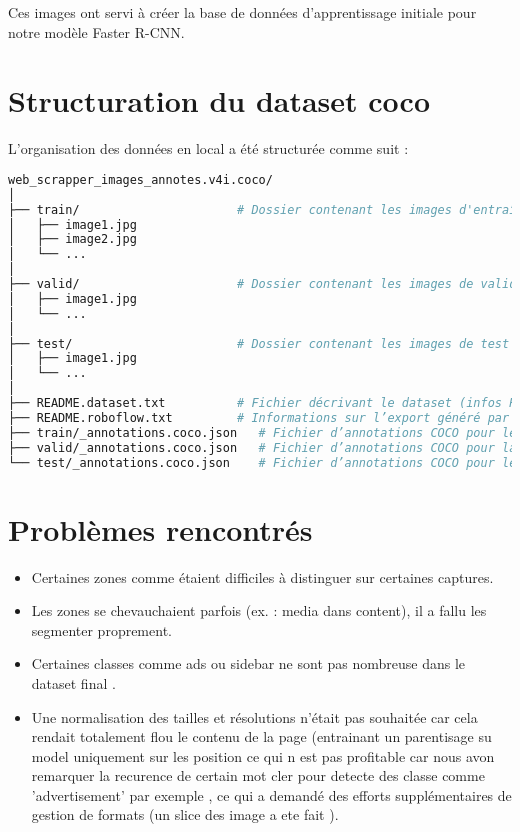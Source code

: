 \documentclass[12pt,a4paper]{report}
\begin{document}
Ces images ont servi à créer la base de données d'apprentissage initiale pour notre modèle Faster R-CNN.

\section{Structuration du dataset coco }

L'organisation des données en local a été structurée comme suit :

\begin{lstlisting}[language=bash,caption={Structure du dataset exporté depuis Roboflow (format COCO)},label={lst:roboflow-structure}]
web_scrapper_images_annotes.v4i.coco/
│
├── train/                      # Dossier contenant les images d'entraînement
│   ├── image1.jpg
│   ├── image2.jpg
│   └── ...
│
├── valid/                      # Dossier contenant les images de validation
│   ├── image1.jpg
│   └── ...
│
├── test/                       # Dossier contenant les images de test
│   ├── image1.jpg
│   └── ...
│
├── README.dataset.txt          # Fichier décrivant le dataset (infos Roboflow, classes, etc.)
├── README.roboflow.txt         # Informations sur l’export généré par Roboflow
├── train/_annotations.coco.json   # Fichier d’annotations COCO pour les images d'entraînement
├── valid/_annotations.coco.json   # Fichier d’annotations COCO pour la validation
└── test/_annotations.coco.json    # Fichier d’annotations COCO pour le test
\end{lstlisting}


\section{Problèmes rencontrés}
\begin{itemize}
\item Certaines zones comme  étaient difficiles à distinguer sur certaines captures.
\item Les zones se chevauchaient parfois (ex. : media dans content), il a fallu les segmenter proprement.
\item Certaines classes comme ads ou sidebar ne sont pas nombreuse dans le dataset final .
\item Une normalisation des tailles et résolutions n'était pas souhaitée car cela rendait totalement flou le contenu de la page (entrainant un parentisage su model uniquement sur les position ce qui n est pas  profitable car nous avon remarquer la recurence de certain mot cler pour detecte des classe comme 'advertisement' par exemple , ce qui a demandé des efforts supplémentaires de gestion de formats (un slice des image a ete fait ).
\end{itemize}
\end{document}
